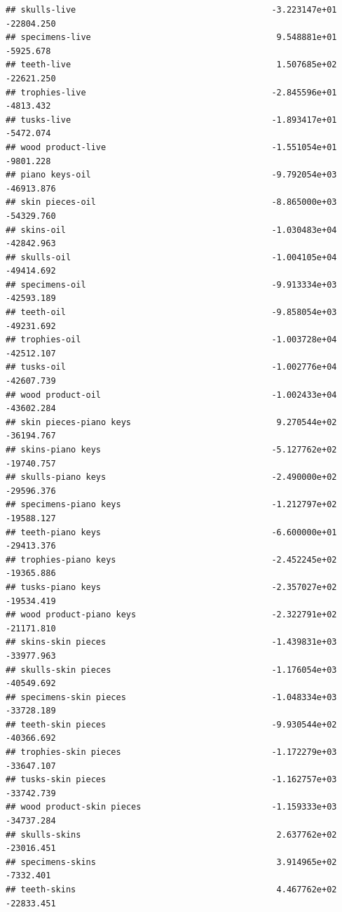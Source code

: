 \documentclass[
  12pt,
]{article}
\begin{document}
\begin{verbatim}
## skulls-live                                       -3.223147e+01  -22804.250
## specimens-live                                     9.548881e+01   -5925.678
## teeth-live                                         1.507685e+02  -22621.250
## trophies-live                                     -2.845596e+01   -4813.432
## tusks-live                                        -1.893417e+01   -5472.074
## wood product-live                                 -1.551054e+01   -9801.228
## piano keys-oil                                    -9.792054e+03  -46913.876
## skin pieces-oil                                   -8.865000e+03  -54329.760
## skins-oil                                         -1.030483e+04  -42842.963
## skulls-oil                                        -1.004105e+04  -49414.692
## specimens-oil                                     -9.913334e+03  -42593.189
## teeth-oil                                         -9.858054e+03  -49231.692
## trophies-oil                                      -1.003728e+04  -42512.107
## tusks-oil                                         -1.002776e+04  -42607.739
## wood product-oil                                  -1.002433e+04  -43602.284
## skin pieces-piano keys                             9.270544e+02  -36194.767
## skins-piano keys                                  -5.127762e+02  -19740.757
## skulls-piano keys                                 -2.490000e+02  -29596.376
## specimens-piano keys                              -1.212797e+02  -19588.127
## teeth-piano keys                                  -6.600000e+01  -29413.376
## trophies-piano keys                               -2.452245e+02  -19365.886
## tusks-piano keys                                  -2.357027e+02  -19534.419
## wood product-piano keys                           -2.322791e+02  -21171.810
## skins-skin pieces                                 -1.439831e+03  -33977.963
## skulls-skin pieces                                -1.176054e+03  -40549.692
## specimens-skin pieces                             -1.048334e+03  -33728.189
## teeth-skin pieces                                 -9.930544e+02  -40366.692
## trophies-skin pieces                              -1.172279e+03  -33647.107
## tusks-skin pieces                                 -1.162757e+03  -33742.739
## wood product-skin pieces                          -1.159333e+03  -34737.284
## skulls-skins                                       2.637762e+02  -23016.451
## specimens-skins                                    3.914965e+02   -7332.401
## teeth-skins                                        4.467762e+02  -22833.451

\end{verbatim}
\end{document}
